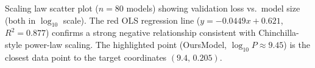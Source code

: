 \caption{Scaling law scatter plot ($n=80$ models) showing validation loss vs.\ model size (both in $\log_{10}$ scale). The red OLS regression line ($y = -0.0449x + 0.621$, $R^2 = 0.877$) confirms a strong negative relationship consistent with Chinchilla-style power-law scaling. The highlighted point (OursModel, $\log_{10}P \approx 9.45$) is the closest data point to the target coordinates $(9.4,\,0.205)$.}
